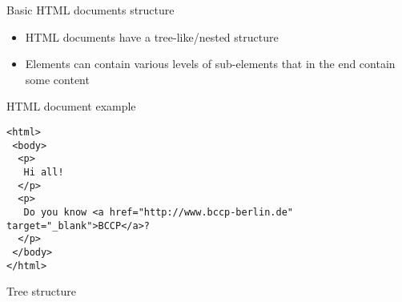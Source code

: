 \begin{frame}{Basic HTML documents structure}
\begin{itemize}
	\item HTML documents have a tree-like/nested structure
	\item Elements can contain various levels of sub-elements that in the end contain some content
\end{itemize}
\end{frame}

\begin{frame}[fragile]{HTML document example}
\begin{verbatim}
<html>
 <body>
  <p>
   Hi all!
  </p>
  <p>
   Do you know <a href="http://www.bccp-berlin.de" target="_blank">BCCP</a>?
  </p>
 </body>
</html>
\end{verbatim}
\end{frame}

\begin{frame}[fragile]{Tree structure}
\begin{center}
\end{center}
\end{frame}

